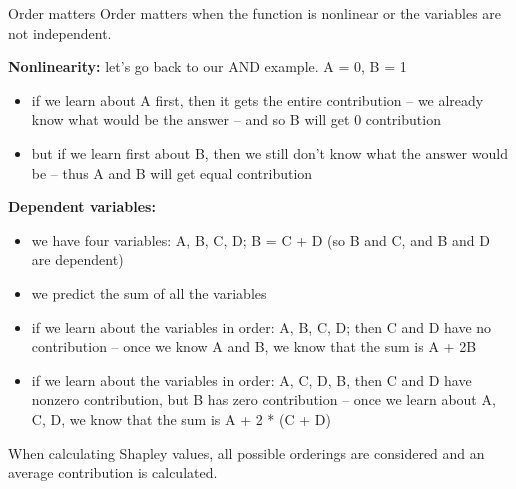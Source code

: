 \begin{frame}{Order matters}
    \footnotesize
    Order matters when the function is nonlinear or the variables are not independent.

    \textbf{Nonlinearity:} let's go back to our AND example. A = 0, B = 1
    \begin{itemize}
        \item if we learn about A first, then it gets the entire contribution -- we already know what would be the answer -- and so B will get 0 contribution
        \item but if we learn first about B, then we still don't know what the answer would be -- thus A and B will get equal contribution
    \end{itemize}

    \textbf{Dependent variables:}
    \begin{itemize}
        \item we have four variables: A, B, C, D; B = C + D (so B and C, and B and D are dependent)
        \item we predict the sum of all the variables
        \item if we learn about the variables in order: A, B, C, D; then C and D have no contribution -- once we know A and B, we know that the sum is A + 2B
        \item if we learn about the variables in order: A, C, D, B, then C and D have nonzero contribution, but B has zero contribution -- once we learn about A, C, D, we know that the sum is A + 2 * (C + D)
    \end{itemize}

    When calculating Shapley values, all possible orderings are considered and an average contribution is calculated.

\end{frame}

